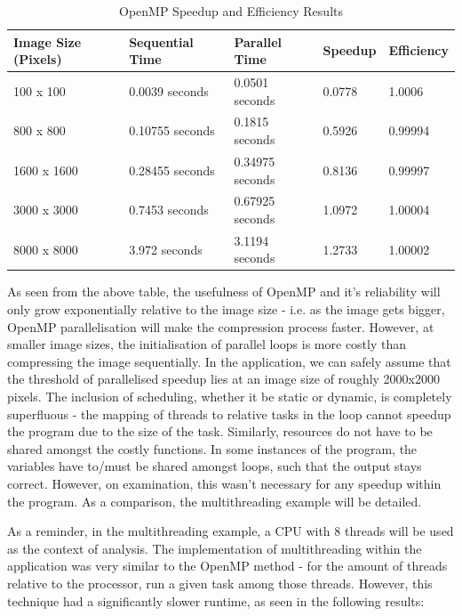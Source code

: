 \documentclass[12pt, a4paper]{article}
\begin{document}
\begin{table}[H]
    \centering
    \begin{tabular}{| l | l | l | l | l |}
    \hline
    Image Size (Pixels) & Sequential Time & Parallel Time & Speedup & Efficiency \\ \hline
    100 x 100 & 0.0039 seconds & 0.0501 seconds & 0.0778 & 1.0006 \\ \hline
    800 x 800 & 0.10755 seconds & 0.1815 seconds & 0.5926 & 0.99994 \\ \hline
    1600 x 1600 & 0.28455 seconds & 0.34975 seconds & 0.8136 & 0.99997 \\ \hline
    3000 x 3000 & 0.7453 seconds & 0.67925 seconds & 1.0972 & 1.00004 \\ \hline
    8000 x 8000 & 3.972 seconds & 3.1194 seconds & 1.2733 & 1.00002 \\ \hline
    \end{tabular}
    \caption{OpenMP Speedup and Efficiency Results}
\end{table}

As seen from the above table, the usefulness of OpenMP and it's reliability will only grow exponentially relative to the image size - i.e. as the image gets bigger, OpenMP parallelisation will make the compression process faster. However, at smaller image sizes, the initialisation of parallel loops is more costly than compressing the image sequentially. In the application, we can safely assume that the threshold of parallelised speedup lies at an image size of roughly 2000x2000 pixels. The inclusion of scheduling, whether it be static or dynamic, is completely superfluous - the mapping of threads to relative tasks in the loop cannot speedup the program due to the size of the task. Similarly, resources do not have to be shared amongst the costly functions. In some instances of the program, the variables have to/must be shared amongst loops, such that the output stays correct. However, on examination, this wasn't necessary for any speedup within the program. As a comparison, the multithreading example will be detailed.

As a reminder, in the multithreading example, a CPU with 8 threads will be used as the context of analysis. The implementation of multithreading within the application was very similar to the OpenMP method - for the amount of threads relative to the processor, run a given task among those threads. However, this technique had a significantly slower runtime, as seen in the following results:
\end{document}
